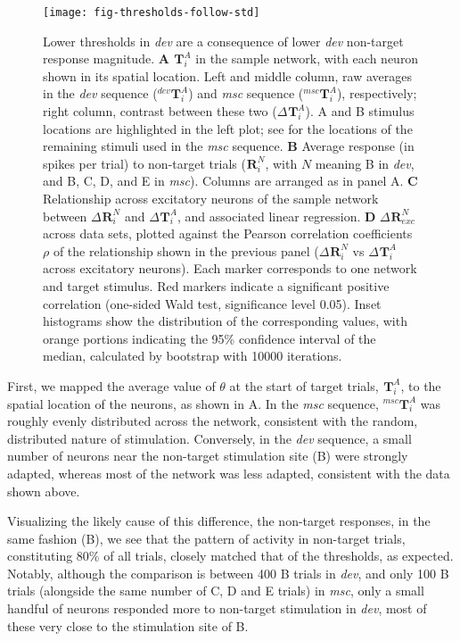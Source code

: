 \documentclass[9pt,lineno,onehalfspacing]{elife}
\newcommand{\dev}{\textit{dev}}
\newcommand{\msc}{\textit{msc}}
\newcommand{\R}[3][]{{}^{#1}_{}\boldsymbol R^{#2}_{#3}}
\newcommand{\T}[3][]{{}^{#1}_{}\boldsymbol T^{#2}_{#3}}
\begin{document}
\begin{figure}
    \texttt{[image: fig-thresholds-follow-std]}
    \caption{%
        Lower thresholds in \dev{} are a consequence of lower \dev{} non-target response magnitude.
        \textbf{A} $\T{A}{i}$ in the sample network, with each neuron shown in its spatial location. Left and middle column, raw averages in the \dev{} sequence ($\T[dev]{A}{i}$) and \msc{} sequence ($\T[msc]{A}{i}$), respectively; right column, contrast between these two ($\Delta \T{A}{i}$). A and B stimulus locations are highlighted in the left plot; see  for the locations of the remaining stimuli used in the \msc{} sequence.
        \textbf{B} Average response (in spikes per trial) to non-target trials ($\R{N}{i}$, with $N$ meaning B in \dev{}, and B, C, D, and E in \msc{}). Columns are arranged as in panel A.
        \textbf{C} Relationship across excitatory neurons of the sample network between $\Delta \R{N}{i}$ and $\Delta \T{A}{i}$, and associated linear regression.
        \textbf{D} $\Delta \R{N}{exc}$ across data sets, plotted against the Pearson correlation coefficients $\rho$ of the relationship shown in the previous panel ($\Delta \R{N}{i}$ vs $\Delta \T{A}{i}$ across excitatory neurons). Each marker corresponds to one network and target stimulus. Red markers indicate a significant positive correlation (one-sided Wald test, significance level 0.05). Inset histograms show the distribution of the corresponding values, with orange portions indicating the 95\% confidence interval of the median, calculated by bootstrap with 10000 iterations.
    }
    \label{fig:thresholds-follow-std}
\end{figure}

First, we mapped the average value of $\theta$ at the start of target trials, $\T{A}{i}$, to the spatial location of the neurons, as shown in A. In the \msc{} sequence, $\T[msc]{A}{i}$ was roughly evenly distributed across the network, consistent with the random, distributed nature of stimulation. Conversely, in the \dev{} sequence, a small number of neurons near the non-target stimulation site (B) were strongly adapted, whereas most of the network was less adapted, consistent with the data shown above.

Visualizing the likely cause of this difference, the non-target responses, in the same fashion (B), we see that the pattern of activity in non-target trials, constituting 80\% of all trials, closely matched that of the thresholds, as expected. Notably, although the comparison is between 400 B trials in \dev{}, and only 100 B trials (alongside the same number of C, D and E trials) in \msc{}, only a small handful of neurons responded more to non-target stimulation in \dev{}, most of these very close to the stimulation site of B.
\end{document}

